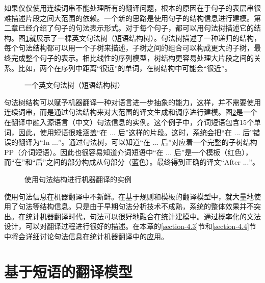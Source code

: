 \parinterval 如果仅仅使用连续词串不能处理所有的翻译问题，根本的原因在于句子的表层串很难描述片段之间大范围的依赖。一个新的思路是使用句子的结构信息进行建模。第二章已经介绍了句子的句法表示形式。对于每个句子，都可以用句法树描述它的结构。图\ref{fig:4-7}就展示了一棵英文句法树（短语结构树）。句法树描述了一种递归的结构，每个句法结构都可以用一个子树来描述，子树之间的组合可以构成更大的子树，最终完成整个句子的表示。相比线性的序列模型，树结构更容易处理大片段之间的关系。比如，两个在序列中距离``很远''的单词，在树结构中可能会``很近''。

\begin{figure}[htp]
\centering

\caption{一个英文句法树（短语结构树）}
\label{fig:4-7}
\end{figure}

\parinterval 句法树结构可以赋予机器翻译一种对语言进一步抽象的能力，这样，并不需要使用连续词串，而是通过句法结构来对大范围的译文生成和调序进行建模。图\ref{fig:4-8}是一个在翻译中融入源语言（中文）句法信息的实例。这个例子中，介词短语包含15个单词，因此，使用短语很难涵盖``在 $...$ 后''这样的片段。这时，系统会把``在 $...$ 后''错误的翻译为``In $...$''。通过句法树，可以知道``在 $...$ 后''对应着一个完整的子树结构PP（介词短语）。因此也很容易知道介词短语中``在 $...$ 后''是一个模板（红色），而``在''和``后''之间的部分构成从句部分（蓝色）。最终得到正确的译文``After $...$''。

\begin{figure}[htp]
\centering

\caption{使用句法结构进行机器翻译的实例}
\label{fig:4-8}
\end{figure}

\parinterval 使用句法信息在机器翻译中不新鲜。在基于规则和模板的翻译模型中，就大量地使用了句法等结构信息。只是由于早期句法分析技术不成熟，系统的整体效果并不突出。在统计机器翻译时代，句法可以很好地融合在统计建模中。通过概率化的文法设计，可以对翻译过程进行很好的描述。在本章的\ref{section-4.3}节和\ref{section-4.4}节中将会详细讨论句法信息在统计机器翻译中的应用。


\sectionnewpage
\section{基于短语的翻译模型}\label{section-4.2}

